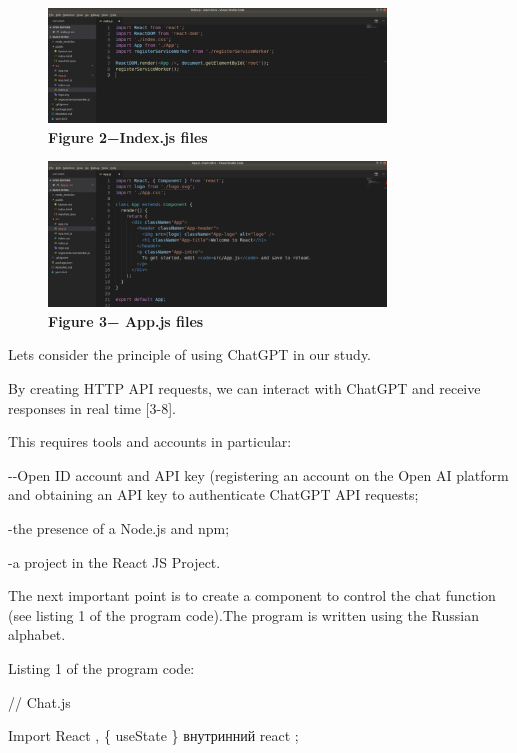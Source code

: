 \begin{figure}[H]
	\centering
	\includegraphics[width=0.8\textwidth]{assets/127}
	\caption*{\bfseries Figure 2−Index.js files}
\end{figure}


\begin{figure}[H]
	\centering
	\includegraphics[width=0.8\textwidth]{assets/128}
	\caption*{\bfseries Figure 3− App.js files}
\end{figure}

\begin{multicols}{2}

Let\textquotesingle s consider the principle of using ChatGPT in our
study.

By creating HTTP API requests, we can interact with ChatGPT and receive
responses in real time {[}3-8{]}.

This requires tools and accounts in particular:

-\/-Open ID account and API key (registering an account on the Open AI
platform and obtaining an API key to authenticate ChatGPT API requests;

-the presence of a Node.js and npm;

-a project in the React JS Project.

The next important point is to create a component to control the chat
function (see listing 1 of the program code).The program is written
using the Russian alphabet.

Listing 1 of the program code:
\end{multicols}


// Chat.js

Import React , \{ useState \} внутринний
\textquotesingle react\textquotesingle{} ;

